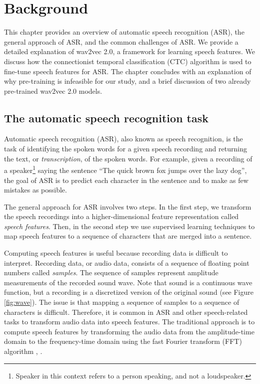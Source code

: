 \graphicspath{{background/fig/}}

\chapter{Background} \label{chap:background}
This chapter provides an overview of automatic speech recognition (ASR), the general approach of ASR, and the common challenges of ASR.
We provide a detailed explanation of wav2vec 2.0, a framework for learning speech features.
We discuss how the connectionist temporal classification (CTC) algorithm is used to fine-tune speech features for ASR.
The chapter concludes with an explanation of why pre-training is infeasible for our study,
and a brief discussion of two already pre-trained wav2vec 2.0 models.

\section{The automatic speech recognition task}\label{sec:background}
Automatic speech recognition (ASR), also known as speech recognition, 
is the task of identifying the spoken words for a given speech recording and returning the text, or \emph{transcription}, of the spoken words.
For example, given a recording of a speaker\footnote{Speaker in this context refers to a person speaking, and not a loudspeaker.} saying the sentence ``The quick brown fox jumps over the lazy dog'',
the goal of ASR is to predict each character in the sentence and to make as few mistakes as possible.

The general approach for ASR involves two steps.
In the first step, we transform the speech recordings into a higher-dimensional feature representation called \emph{speech features}.
Then, in the second step we use supervised learning techniques to map speech features
to a sequence of characters that are merged into a sentence.

Computing speech features is useful because recording data is difficult to interpret. 
Recording data, or audio data, consists of a sequence of floating point numbers called \emph{samples}.
The sequence of samples represent amplitude measurements of the recorded sound wave. 
Note that sound is a continuous wave function, but a recording is a discretized version of the original sound (see Figure \ref{fig:wave}).
The issue is that mapping a sequence of samples to a sequence of characters is difficult.
Therefore, it is common in ASR and other speech-related tasks to transform audio data into speech features.
The traditional approach is to compute speech features by transforming the audio data from the amplitude-time domain 
to the frequency-time domain using the fast Fourier transform (FFT) algorithm \cite{cochran1967fast}, \cite{cooley1969fast}.

